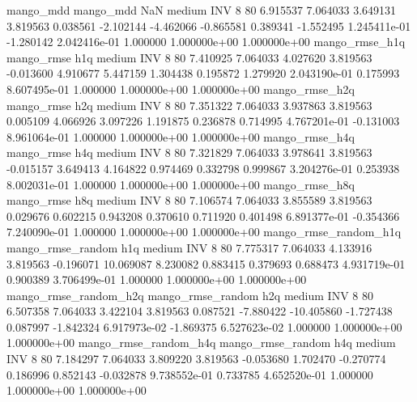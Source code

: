             mango_mdd         mango_mdd                  NaN     medium      INV                 8 80  6.915537       7.064033 3.649131       3.819563    0.038561     -2.102144     -4.462066    -0.865581       0.389341 -1.552495 1.245411e-01    -1.280142   2.042416e-01            1.000000    1.000000e+00        1.000000e+00
       mango_rmse_h1q        mango_rmse                  h1q     medium      INV                 8 80  7.410925       7.064033 4.027620       3.819563   -0.013600      4.910677      5.447159     1.304438       0.195872  1.279920 2.043190e-01     0.175993   8.607495e-01            1.000000    1.000000e+00        1.000000e+00
       mango_rmse_h2q        mango_rmse                  h2q     medium      INV                 8 80  7.351322       7.064033 3.937863       3.819563    0.005109      4.066926      3.097226     1.191875       0.236878  0.714995 4.767201e-01    -0.131003   8.961064e-01            1.000000    1.000000e+00        1.000000e+00
       mango_rmse_h4q        mango_rmse                  h4q     medium      INV                 8 80  7.321829       7.064033 3.978641       3.819563   -0.015157      3.649413      4.164822     0.974469       0.332798  0.999867 3.204276e-01     0.253938   8.002031e-01            1.000000    1.000000e+00        1.000000e+00
       mango_rmse_h8q        mango_rmse                  h8q     medium      INV                 8 80  7.106574       7.064033 3.855589       3.819563    0.029676      0.602215      0.943208     0.370610       0.711920  0.401498 6.891377e-01    -0.354366   7.240090e-01            1.000000    1.000000e+00        1.000000e+00
mango_rmse_random_h1q mango_rmse_random                  h1q     medium      INV                 8 80  7.775317       7.064033 4.133916       3.819563   -0.196071     10.069087      8.230082     0.883415       0.379693  0.688473 4.931719e-01     0.900389   3.706499e-01            1.000000    1.000000e+00        1.000000e+00
mango_rmse_random_h2q mango_rmse_random                  h2q     medium      INV                 8 80  6.507358       7.064033 3.422104       3.819563    0.087521     -7.880422    -10.405860    -1.727438       0.087997 -1.842324 6.917973e-02    -1.869375   6.527623e-02            1.000000    1.000000e+00        1.000000e+00
mango_rmse_random_h4q mango_rmse_random                  h4q     medium      INV                 8 80  7.184297       7.064033 3.809220       3.819563   -0.053680      1.702470     -0.270774     0.186996       0.852143 -0.032878 9.738552e-01     0.733785   4.652520e-01            1.000000    1.000000e+00        1.000000e+00
